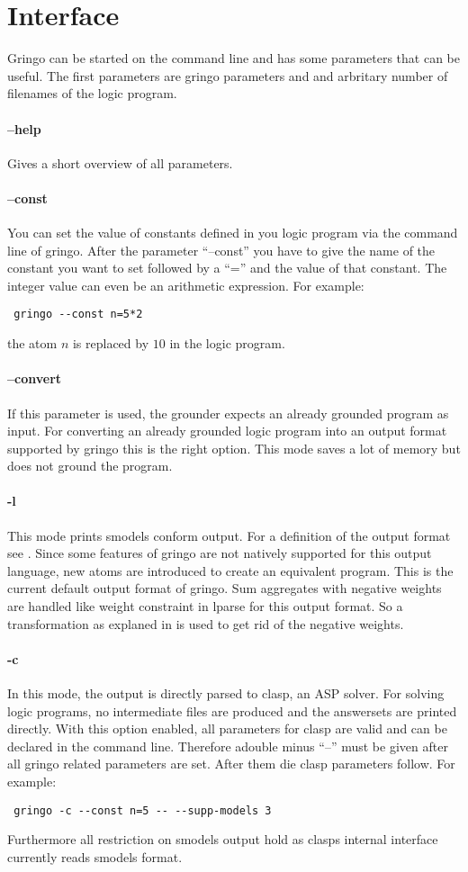 \documentclass[a4paper,10pt]{article}
\begin{document}
\section{Interface}
Gringo can be started on the command line and has some parameters that can be useful.
The first parameters are gringo parameters and and arbritary number of filenames of the logic program.
\paragraph{--help}
Gives a short overview of all parameters.
\paragraph{--const}
You can set the value of constants defined in you logic program via the command line of gringo.
After the parameter ``--const'' you have to give the name of the constant you want to set followed by a ``='' and the value of that constant. The integer value can even be an arithmetic expression. For example:
\begin{verbatim}
 gringo --const n=5*2
\end{verbatim}
the atom $n$ is replaced by $10$ in the logic program.

\paragraph{--convert}
If this parameter is used, the grounder expects an already grounded program as input.
For converting an already grounded logic program into an output format supported by gringo this is the right option. This mode saves a lot of memory but does not ground the program.
\paragraph{-l}
This mode prints smodels conform output. For a definition of the output format see \cite{lparseManual}.
Since some features of gringo are not natively supported for this output language, new atoms are introduced to create an equivalent program.\newline
This is the current default output format of gringo.
Sum aggregates with negative weights are handled like weight constraint in lparse for this output format. So a transformation as explaned in \cite{lparseManual} is used to get rid of the negative weights.
\paragraph{-c}
In this mode, the output is directly parsed to clasp, an ASP solver. For solving logic programs, no intermediate files are produced and the answersets are printed directly.
With this option enabled, all parameters for clasp are valid and can be declared in the command line. Therefore adouble minus ``--'' must be given after all gringo related parameters are set. After them die clasp parameters follow.
For example:
\begin{verbatim}
 gringo -c --const n=5 -- --supp-models 3
\end{verbatim}
Furthermore all restriction on smodels output hold as clasps internal interface currently reads smodels format.
\end{document}
